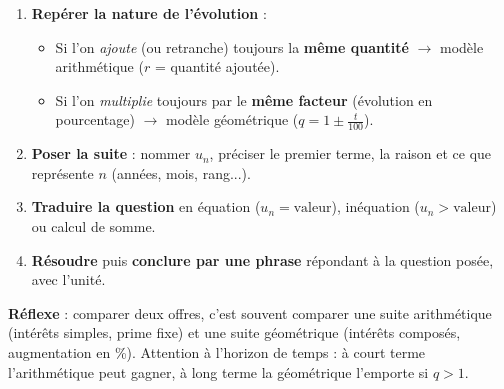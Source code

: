 \documentclass[11pt]{article}
\newcommand{\cle}[1]{{\popxbold\color{popdark}#1}}
\begin{document}
\begin{methode}
\begin{enumerate}
\item \textbf{Repérer la nature de l'évolution} :
\begin{itemize}
\item Si l'on \emph{ajoute} (ou retranche) toujours la \textbf{même quantité} $\rightarrow$ modèle \cle{arithmétique} ($r$ = quantité ajoutée).
\item Si l'on \emph{multiplie} toujours par le \textbf{même facteur} (évolution en pourcentage) $\rightarrow$ modèle \cle{géométrique} ($q = 1 \pm \frac{t}{100}$).
\end{itemize}
\item \textbf{Poser la suite} : nommer $u_n$, préciser le premier terme, la raison et ce que représente $n$ (années, mois, rang...).
\item \textbf{Traduire la question} en équation ($u_n = \text{valeur}$), inéquation ($u_n > \text{valeur}$) ou calcul de somme.
\item \textbf{Résoudre} puis \textbf{conclure par une phrase} répondant à la question posée, avec l'unité.
\end{enumerate}
\textbf{Réflexe} : comparer deux offres, c'est souvent comparer une suite arithmétique (intérêts simples, prime fixe) et une suite géométrique (intérêts composés, augmentation en \%). Attention à l'horizon de temps : à court terme l'arithmétique peut gagner, à long terme la géométrique l'emporte si $q>1$.
\end{methode}
\end{document}
